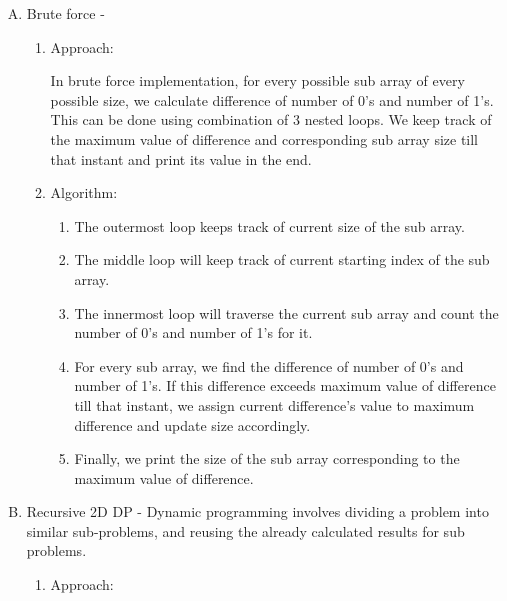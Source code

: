 \documentclass[conference]{IEEEtran}
\begin{document}
{\begin{enumerate}[A)]
  \item Brute force -
  \begin{enumerate}
    \item Approach:
    
       In brute force implementation, for every possible sub array of every possible size, we calculate difference of number of 0's and number of 1's. This can be done using combination of 3 nested loops. We keep track of the maximum value of difference and corresponding sub array size till that instant and print its value in the end.
    \item Algorithm:
    \begin{enumerate}
    \item The outermost loop keeps track of current size of the sub array.
    \item The middle loop will keep track of current starting index of the sub array.
    \item The innermost loop will traverse the current sub array and count the number of 0's and number of 1's for it.
\item For every sub array, we find the difference of number of 0's and number of 1's. If this difference exceeds maximum value of difference till that instant, we assign current difference's value to maximum difference and update size accordingly.
\item Finally, we print the size of the sub array corresponding to the maximum value of difference.\\
    \end{enumerate}
    \end{enumerate}
    
    \item Recursive 2D DP - 
    Dynamic programming involves dividing a problem into similar sub-problems, and reusing the already calculated results for sub problems.

    \begin{enumerate}
    \item Approach:
    

\end{enumerate}
\end{enumerate}}
\end{document}
